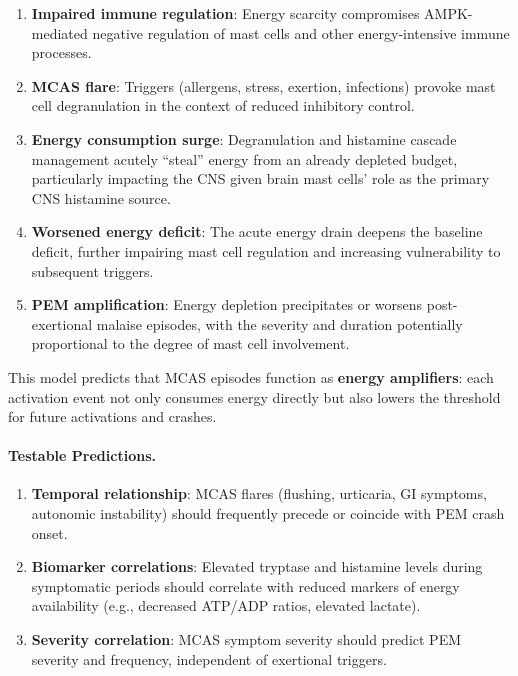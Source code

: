 \begin{speculation}
\begin{enumerate}
    \item \textbf{Impaired immune regulation}: Energy scarcity compromises AMPK-mediated negative regulation of mast cells and other energy-intensive immune processes.

    \item \textbf{MCAS flare}: Triggers (allergens, stress, exertion, infections) provoke mast cell degranulation in the context of reduced inhibitory control.

    \item \textbf{Energy consumption surge}: Degranulation and histamine cascade management acutely ``steal'' energy from an already depleted budget, particularly impacting the CNS given brain mast cells' role as the primary CNS histamine source.

    \item \textbf{Worsened energy deficit}: The acute energy drain deepens the baseline deficit, further impairing mast cell regulation and increasing vulnerability to subsequent triggers.

    \item \textbf{PEM amplification}: Energy depletion precipitates or worsens post-exertional malaise episodes, with the severity and duration potentially proportional to the degree of mast cell involvement.
\end{enumerate}

This model predicts that MCAS episodes function as \textbf{energy amplifiers}: each activation event not only consumes energy directly but also lowers the threshold for future activations and crashes.

\paragraph{Testable Predictions.}

\begin{enumerate}
    \item \textbf{Temporal relationship}: MCAS flares (flushing, urticaria, GI symptoms, autonomic instability) should frequently precede or coincide with PEM crash onset.

    \item \textbf{Biomarker correlations}: Elevated tryptase and histamine levels during symptomatic periods should correlate with reduced markers of energy availability (e.g., decreased ATP/ADP ratios, elevated lactate).

    \item \textbf{Severity correlation}: MCAS symptom severity should predict PEM severity and frequency, independent of exertional triggers.


\end{enumerate}
\end{speculation}
